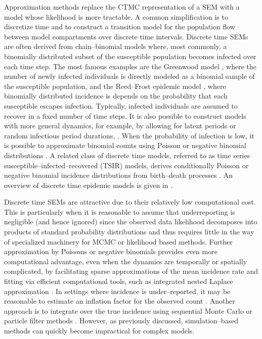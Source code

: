 Approximation methods replace the CTMC representation of a SEM with a model whose likelihood is more tractable. A common simplification is to discretize time and to construct a transition model for the population flow between model compartments over discrete time intervals. Discrete time SEMs are often derived from chain--binomial models where, most commonly, a binomially distributed subset of the susceptible population becomes infected over each time step. The most famous examples are the Greenwood model \cite{greenwood1931statistical}, where the number of newly infected individuals is directly modeled as a binomial sample of the susceptible population, and the Reed--Frost epidemic model \cite{abbey1952examination}, where binomially distributed incidence is depends on the probability that each susceptible escapes infection. Typically, infected individuals are assumed to recover in a fixed number of time steps. It is also possible to construct models with more general dynamics, for example, by allowing for latent periods or random infectious period durations, \cite{lekone2006}. When the probability of infection is low, it is possible to approximate binomial counts using Poisson or negative binomial distributions \cite{held2005,paul2011predictive}. A related class of discrete time models, referred to as time series susceptible--infected--recovered (TSIR) models, derives conditionally Poisson or negative binomial incidence distributions from birth--death processes \cite{bjornstad2002dynamics,finkenstadt2000time,finkenstadt2002stochastic,glass2003}. An overview of discrete time epidemic models is given in \cite{wakefield2017spatio}.

Discrete time SEMs are attractive due to their relatively low computational cost. This is particularly when it is reasonable to assume that underreporting is negligible (and hence ignored) since the observed data likelihood decomposes into products of standard probability distributions and thus requires little in the way of specialized machinery for MCMC or likelihood based methods. Further approximation by Poissons or negative binomials provides even more computational advantage, even when the dynamics are temporally or spatially complicated, by facilitating sparse approximations of the mean incidence rate and fitting via efficient computational tools, such as integrated nested Laplace approximation  \cite{bauer2016bayesian,held2005,fisher2017time,meyer2017incorporating}. In settings where incidence is under--reported, it may be reasonable to estimate an inflation factor for the observed count \cite{finkenstadt2000time,wakefield2017spatio}. Another approach is to integrate over the true incidence using sequential Monte Carlo or particle filter methods \cite{dukic2012,ionides2006inference,ionides2011iterated,shubin2016revealing}. However, as previously discussed, simulation--based methods can quickly become impractical for complex models. 

